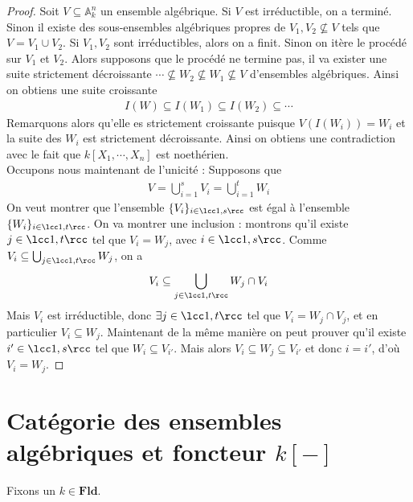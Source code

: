             \begin{proof}
                Soit $V \subseteq \mathbb{A}_k^n$ un ensemble algébrique. Si $V$ est irréductible, on a terminé. Sinon il existe des sous-ensembles algébriques propres de $V_1, V_2 \nsubseteq V$ tels que $V = V_1 \cup V_2$. Si $V_1,V_2$ sont irréductibles, alors on a finit. Sinon on itère le procédé sur $V_1$ et $V_2$. Alors supposons que le procédé ne termine pas, il va exister une suite strictement décroissante $\cdots \nsubseteq W_2 \nsubseteq W_1 \nsubseteq V$ d'ensembles algébriques. Ainsi on obtiens une suite croissante
                \begin{align*}
                    I(W) \subseteq I(W_1) \subseteq I(W_2) \subseteq \cdots
                \end{align*}
                Remarquons alors qu'elle es strictement croissante puisque $V(I(W_i)) = W_i$ et la suite des $W_i$ est strictement décroissante. Ainsi on obtiens une contradiction avec le fait que $k[X_1, \cdots, X_n]$ est noethérien. \\
                Occupons nous maintenant de l'unicité : Supposons que 
                \begin{align*}
                    V = \bigcup_{i = 1}^s V_i = \bigcup_{i = 1}^t W_i
                \end{align*}
                On veut montrer que l'ensemble $\{V_i\}_{i \in \lcc 1,s \rcc}$ est égal à l'ensemble $\{W_i\}_{i \in \lcc 1,t \rcc}$. On va montrer une inclusion : montrons qu'il existe $j \in \lcc 1,t \rcc$ tel que $V_i = W_j$, avec $i \in \lcc 1,s \rcc$. Comme $V_i \subseteq \bigcup_{j \in \lcc 1,t \rcc} W_j$, on a
                \begin{align*}
                    V_i \subseteq \bigcup_{j \in \lcc 1,t \rcc} W_j \cap V_i
                \end{align*}
                Mais $V_i$ est irréductible, donc $\exists j \in \lcc 1,t \rcc$ tel que $V_i = W_j \cap V_j$, et en particulier $V_i \subseteq W_j$. Maintenant de la même manière on peut prouver qu'il existe $i' \in \lcc 1,s \rcc$ tel que $W_i \subseteq V_{i'}$. Mais alors $V_i \subseteq W_j \subseteq V_{i'}$ et donc $i = i'$, d'où $V_i = W_j$.
            \end{proof}
            

    \section{Catégorie des ensembles algébriques et foncteur $k[-]$}
        Fixons un $k \in \mathbf{Fld}$.
